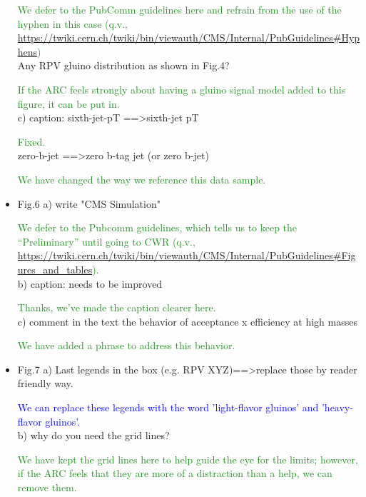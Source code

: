 \documentclass[paper=a4, fontsize=11pt]{scrartcl}
\begin{document}
\begin{itemize}
\textcolor{ForestGreen}{We defer to the PubComm guidelines here and refrain from the use of the hyphen
in this case (q.v., \url{https://twiki.cern.ch/twiki/bin/viewauth/CMS/Internal/PubGuidelines\#Hyphens})}\\


Any RPV gluino distribution as shown in Fig.4? 

\textcolor{ForestGreen}{If the ARC feels strongly about having a gluino signal model added to this
figure, it can be put in.}\\

c) caption: 
sixth-jet-pT ==\textgreater sixth-jet pT 

\textcolor{ForestGreen}{Fixed.}\\

zero-b-jet ==\textgreater zero b-tag jet (or zero b-jet) 

\textcolor{ForestGreen}{We have changed the way we reference this data sample.}\\


\item Fig.6 
a) write "CMS Simulation" 

\textcolor{ForestGreen}{We defer to the Pubcomm guidelines, which tells us to keep the
``Preliminary'' until going to CWR (q.v.,
	\url{https://twiki.cern.ch/twiki/bin/viewauth/CMS/Internal/PubGuidelines\#Figures_and_tables}).}\\


b) caption: needs to be improved

\textcolor{ForestGreen}{Thanks, we've made the caption clearer here.}\\


c) comment in the text the behavior of acceptance x efficiency at high masses 

\textcolor{ForestGreen}{We have added a phrase to address this behavior.}


\item Fig.7 
a) Last legends in the box (e.g. RPV XYZ)==\textgreater replace those by reader friendly way. 

\textcolor{Blue}{We can replace these legends with the word 'light-flavor gluinos' and 'heavy-flavor
gluinos'.}\\


b) why do you need the grid lines? 

\textcolor{ForestGreen}{We have kept the grid lines here to help guide the eye for the limits; however,
if the ARC feels that they are more of a distraction than a help, we can remove them.}\\


\end{itemize}
\end{document}
